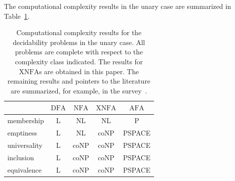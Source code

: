 \documentclass[final,copyright,noderivs]{eptcs}
\theoremstyle{plain}
\theoremstyle{definition}
\newcommand{\dfa}{\textrm{DFA}}
\newcommand{\nfa}{\textrm{NFA}}
\newcommand{\xnfa}{\textrm{XNFA}}
\newcommand{\afa}{\textrm{AFA}}
\begin{document}
The computational complexity results in the unary case are summarized in Table~\ref{tab:complexity2}. 
\begin{table}[ht]
\begin{center}
\begin{tabular}{|l|c|c|c|c|}\hline
&$\dfa$&$\nfa$&$\xnfa$&$\afa$\\ \hline\hline
membership&{\sf L}&{\sf NL}&{\sf NL}&{\sf P}\\ \hline
emptiness&{\sf L}&{\sf NL}&{\sf coNP}&{\sf PSPACE}\\ \hline
universality&{\sf L}&{\sf coNP}&{\sf coNP}&{\sf PSPACE}\\ \hline
inclusion&{\sf L}&{\sf coNP}&{\sf coNP}&{\sf PSPACE}\\ \hline
equivalence&{\sf L}&{\sf coNP}&{\sf coNP}&{\sf PSPACE}\\ \hline
\end{tabular}
\end{center}
\caption{Computational complexity results for the decidability problems in the unary case.
All problems are complete with respect to the complexity class indicated. The results
for $\xnfa$s are obtained in this paper. The remaining results and pointers to the
literature are summarized, for example, in the survey~\cite{holzer:2011:dccfa}.}
\label{tab:complexity2}
\end{table}


%
\end{document}
